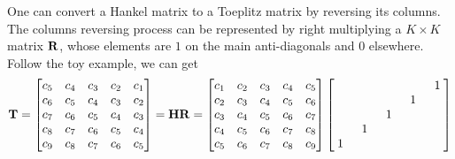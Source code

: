 \documentclass[revised,endfloat]{geophysics}
\begin{document}
One can convert a Hankel matrix to a Toeplitz matrix by reversing its columns. The columns reversing process can be represented by right multiplying a $K \times K$ matrix ${\bf R}$, whose elements are $1$ on the main anti-diagonals and 0 elsewhere. Follow the toy example, we can get
\begin{equation}
{\bf T}= \begin{bmatrix}
c_5 & c_4 & c_3 & c_2 & c_1 \\ 
c_6 & c_5 & c_4 & c_3 & c_2 \\ 
c_7 & c_6 & c_5 & c_4 & c_3 \\ 
c_8 & c_7 & c_6 & c_5 & c_4 \\ 
c_9 & c_8 & c_7 & c_6 & c_5 \\ 
\end{bmatrix} = {\bf HR} = 
\begin{bmatrix}
c_1 & c_2 & c_3 & c_4 & c_5 \\ 
c_2 & c_3 & c_4 & c_5 & c_6 \\ 
c_3 & c_4 & c_5 & c_6 & c_7 \\ 
c_4 & c_5 & c_6 & c_7 & c_8 \\ 
c_5 & c_6 & c_7 & c_8 & c_9 \\ 
\end{bmatrix}
\begin{bmatrix}
\quad & \quad &  \quad &  \quad & 1 \\
\quad & \quad &  \quad &  1 & \quad \\
\quad & \quad &  1 &  \quad & \quad \\
\quad & 1 &  \quad &  \quad & \quad \\
1 & \quad &  \quad &  \quad & \quad \\
\end{bmatrix}
\end{equation}
\end{document}
